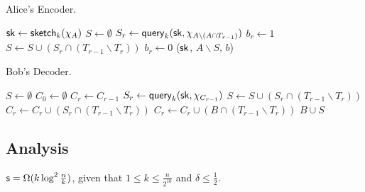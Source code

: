 \begin{algorithm}[H] 
  \caption{Alice's Encoder.} \label{algo:enc4}
  \begin{algorithmic}[1]
    \State $\mathsf{sk} \leftarrow \mathsf{sketch}_k(\chi_A)$
    \State $S\leftarrow \emptyset$
    \State $S_r\leftarrow \mathsf{query}_k(\mathsf{sk}, \chi_{A\backslash (A\cap T_{r-1})})$
     
      \State $b_r\leftarrow 1$ 
      \State $S\leftarrow S \cup (S_r\cap (T_{r-1}\backslash T_r))$
    \Else 
      \State $b_r\leftarrow 0$
    \EndIf
    \EndFor
      \State \Return ($\mathsf{sk}$, $A\backslash S$, $b$) 
    \EndProcedure
  \end{algorithmic}
\end{algorithm}

\begin{algorithm}[H] 
  \caption{Bob's Decoder.} \label{algo:dec4}
  \begin{algorithmic}[1]
    \State $S\leftarrow \emptyset$
    \State $C_0 \leftarrow \emptyset$
      \State $C_r\leftarrow C_{r-1}$
        \State $S_r\leftarrow \mathsf{query}_k(\mathsf{sk}, \chi_{C_{r-1}})$ 
        \State $S\leftarrow S \cup (S_r\cap (T_{r-1}\backslash T_r))$
        \State $C_r\leftarrow C_r \cup (S_r\cap (T_{r-1}\backslash T_r))$
      \EndIf
      \State $C_r\leftarrow C_r \cup (B\cap (T_{r-1}\backslash T_r))$
    \EndFor
    \State \Return $B\cup S$ 
    \EndProcedure
  \end{algorithmic}
\end{algorithm}

\subsection{Analysis}

\begin{theorem}
  $\textsf{s} = \Omega(k\log^2 \frac{n}{k} )$, given that $1 \le k \le \frac{n}{2^{10}}$ and $\delta \le \frac{1}{2}$.
\end{theorem}

